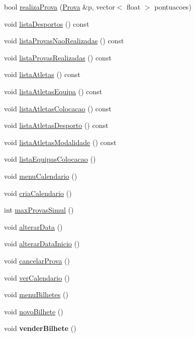 \begin{DoxyCompactItemize}
\item 
bool \hyperlink{class_campeonato_ad5e9506a6ba88e773685c5d5feca69fa}{realiza\+Prova} (\hyperlink{class_prova}{Prova} \&p, vector$<$ float $>$ pontuacoes)
\item 
void \hyperlink{class_campeonato_a1edcd0959381e958aeee95f0d459789e}{lista\+Desportos} () const 
\item 
void \hyperlink{class_campeonato_abc21bdb3d409ca4b798e273bb9cf9998}{lista\+Provas\+Nao\+Realizadas} () const 
\item 
void \hyperlink{class_campeonato_a369de94f78288f4581f00555adbc261d}{lista\+Provas\+Realizadas} () const 
\item 
void \hyperlink{class_campeonato_aab39195cc77498e6a3baa37b76c51340}{lista\+Atletas} () const 
\item 
void \hyperlink{class_campeonato_a6c1c64cbfd00c6b5c2c42d6b159b66a7}{lista\+Atletas\+Equipa} () const 
\item 
void \hyperlink{class_campeonato_accaebf46b994064104641dc82caea41e}{lista\+Atletas\+Colocacao} () const 
\item 
void \hyperlink{class_campeonato_a093452f73eda63721174e45591787781}{lista\+Atletas\+Desporto} () const 
\item 
void \hyperlink{class_campeonato_a496665259e297a59a785a93bca6c2dc3}{lista\+Atletas\+Modalidade} () const 
\item 
void \hyperlink{class_campeonato_a5740a86d0aa5faadecceea93af5ae689}{lista\+Equipas\+Colocacao} ()
\item 
void \hyperlink{class_campeonato_a2a9408c51cdefe23414e329bfde79b8d}{menu\+Calendario} ()
\item 
void \hyperlink{class_campeonato_ac5b37b9497e523987a0974ae612ee549}{cria\+Calendario} ()
\item 
int \hyperlink{class_campeonato_a812285d4ac5056d3a6ecf5bd57a89840}{max\+Provas\+Simul} ()
\item 
void \hyperlink{class_campeonato_a75d613c62e5c1f167c566db5e8b54ea9}{alterar\+Data} ()
\item 
void \hyperlink{class_campeonato_a76943ccf0427a766c98ad43e22828a37}{alterar\+Data\+Inicio} ()
\item 
void \hyperlink{class_campeonato_a7a6196706d07b4ae993c9dc4b39f3ffd}{cancelar\+Prova} ()
\item 
void \hyperlink{class_campeonato_acc32911a6a499bfd37e9317983180fe8}{ver\+Calendario} ()
\item 
void \hyperlink{class_campeonato_ab2dbbdcfb3f3103d9c11115ded85e34d}{menu\+Bilhetes} ()
\item 
void \hyperlink{class_campeonato_ac23d62a3984c3f371b1034823e27005e}{novo\+Bilhete} ()
\item 
\hypertarget{class_campeonato_a65d5927c59b78c039d5d1d9c2b778fc7}{}void {\bfseries vender\+Bilhete} ()\label{class_campeonato_a65d5927c59b78c039d5d1d9c2b778fc7}


\end{DoxyCompactItemize}
